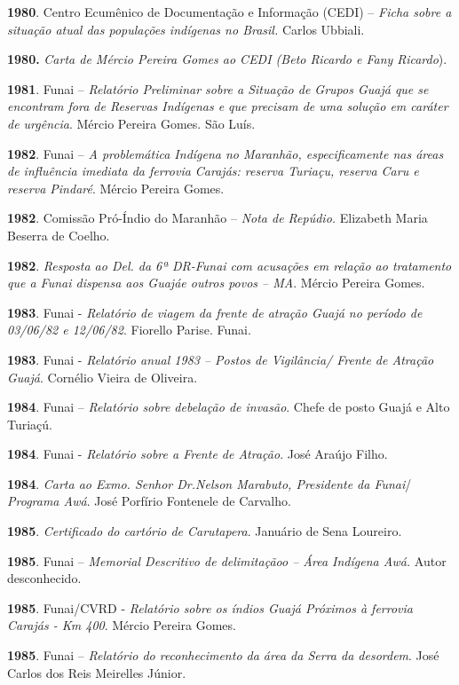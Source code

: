 \textbf{1980}. Centro Ecumênico de Documentação e Informação (CEDI) --
\emph{Ficha sobre a situação atual das populações indígenas no Brasil.}
Carlos Ubbiali.

\textbf{1980.} \emph{Carta de Mércio Pereira Gomes ao CEDI (Beto Ricardo
e Fany Ricardo}).

\textbf{1981}. Funai -- \emph{Relatório Preliminar sobre a Situação de
Grupos Guajá que se encontram fora de Reservas Indígenas e que precisam
de uma solução em caráter de urgência}. Mércio Pereira Gomes. São Luís.

\textbf{1982}. Funai -- \emph{A problemática Indígena no Maranhão,
especificamente nas áreas de influência imediata da ferrovia Carajás:
reserva Turiaçu, reserva Caru e reserva Pindaré}. Mércio Pereira Gomes.

\textbf{1982}. Comissão Pró-Índio do Maranhão -- \emph{Nota de Repúdio.}
Elizabeth Maria Beserra de Coelho.

\textbf{1982}. \emph{Resposta ao Del. da 6ª DR-Funai com acusações em
relação ao tratamento que a Funai dispensa aos Guajáe outros povos --
MA}. Mércio Pereira Gomes.

\textbf{1983}. Funai - \emph{Relatório de viagem da frente de atração
Guajá no período de 03/06/82 e 12/06/82}. Fiorello Parise. Funai.

\textbf{1983}. Funai - \emph{Relatório anual 1983 -- Postos de
Vigilância/ Frente de Atração Guajá}. Cornélio Vieira de Oliveira.

\textbf{1984}. Funai -- \emph{Relatório sobre debelação de invasão}.
Chefe de posto Guajá e Alto Turiaçú.

\textbf{1984}. Funai - \emph{Relatório sobre a Frente de Atração}. José
Araújo Filho.

\textbf{1984}. \emph{Carta ao Exmo. Senhor Dr.Nelson Marabuto,
Presidente da Funai}/ \emph{Programa Awá}. José Porfírio Fontenele de
Carvalho.

\textbf{1985}. \emph{Certificado do cartório de Carutapera}. Januário de
Sena Loureiro.

\textbf{1985}. Funai -- \emph{Memorial Descritivo de delimitaçãoo --
Área Indígena Awá.} Autor desconhecido.

\textbf{1985}. Funai/CVRD - \emph{Relatório sobre os índios Guajá
Próximos à ferrovia Carajás - Km 400}. Mércio Pereira Gomes.

\textbf{1985}. Funai -- \emph{Relatório do reconhecimento da área da
Serra da desordem}. José Carlos dos Reis Meirelles Júnior.

